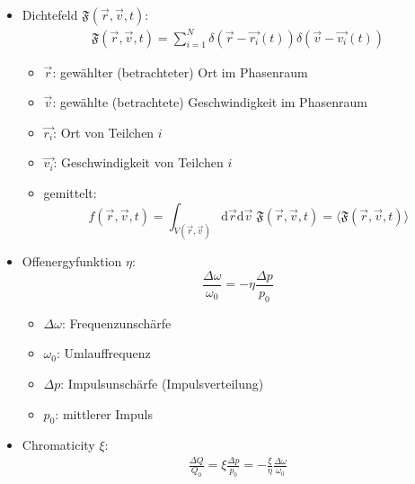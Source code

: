 \documentclass[12pt]{article}%
\newcommand{\itemf}{\item[$\circ$]}
\begin{document}
\begin{itemize}

\item Dichtefeld $\mathfrak{F}(\vec{r}, \vec{v}, t)$:
\begin{align}
\mathfrak{F}(\vec{r}, \vec{v}, t) = \sum_{i=1}^{N} \delta(\vec{r} - \vec{r_i}(t)) \delta(\vec{v} - \vec{v_i}(t))
\end{align}

	\begin{itemize}
		
		\item $\vec{r}$: gewählter (betrachteter) Ort im Phasenraum
		\item $\vec{v}$: gewählte (betrachtete) Geschwindigkeit im Phasenraum
		\item $\vec{r_i}$: Ort von Teilchen $i$
		\item $\vec{v_i}$: Geschwindigkeit von Teilchen $i$
		
	\end{itemize}
	\begin{itemize}
		
		\itemf gemittelt: \[ f(\vec{r}, \vec{v}, t) = \int_{V(\vec{r}, \vec{v})} \mathrm{d}\vec{r} \mathrm{d}\vec{v} \;  \mathfrak{F}(\vec{r}, \vec{v}, t) = \langle \mathfrak{F}(\vec{r}, \vec{v}, t) \rangle \]
	\end{itemize}

\item Offenergyfunktion $\eta$:
\begin{equation}\label{eq:offsetenergy}
\frac{\Delta \omega}{\omega_0} = - \eta \frac{\Delta p}{p_0}
\end{equation}

	\begin{itemize}
	
		\item $\Delta \omega$: Frequenzunschärfe
		\item $\omega_0$: Umlauffrequenz
		\item $\Delta p$: Impulsunschärfe (Impulsverteilung)
		\item $p_0$: mittlerer Impuls
	
	\end{itemize}

\item Chromaticity $\xi$:
\begin{align} \label{eq:chromaticity}
\frac{\Delta Q}{Q_0} = \xi \frac{\Delta p}{p_0} = - \frac{\xi}{\eta} \frac{\Delta \omega}{\omega_0}
\end{align}


\end{itemize}
\end{document}
